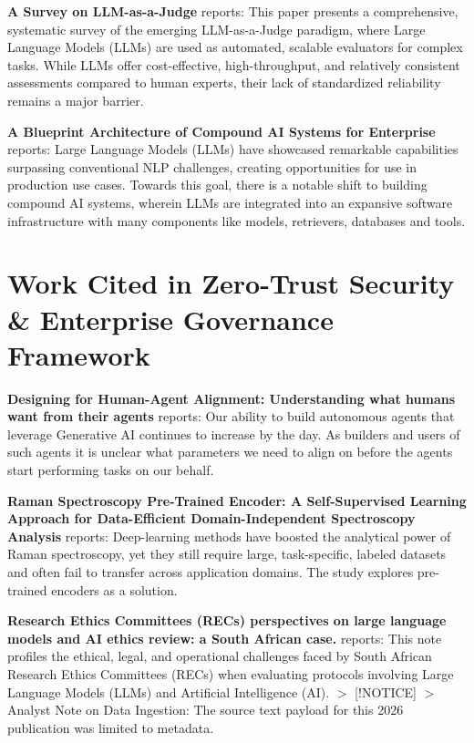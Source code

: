 \documentclass{article}
\begin{document}
\textbf{A Survey on LLM-as-a-Judge} \cite{arxiv_2411_15594} reports: This paper presents a comprehensive, systematic survey of the emerging LLM-as-a-Judge paradigm, where Large Language Models (LLMs) are used as automated, scalable evaluators for complex tasks. While LLMs offer cost-effective, high-throughput, and relatively consistent assessments compared to human experts, their lack of standardized reliability remains a major barrier.

\textbf{A Blueprint Architecture of Compound AI Systems for Enterprise} \cite{arxiv_2406_00584} reports: Large Language Models (LLMs) have showcased remarkable capabilities surpassing conventional NLP challenges, creating opportunities for use in production use cases. Towards this goal, there is a notable shift to building compound AI systems, wherein LLMs are integrated into an expansive software infrastructure with many components like models, retrievers, databases and tools.


\section{Work Cited in Zero-Trust Security \& Enterprise Governance Framework}


\textbf{Designing for Human-Agent Alignment: Understanding what humans want from their agents} \cite{arxiv_2404_04289} reports: Our ability to build autonomous agents that leverage Generative AI continues to increase by the day. As builders and users of such agents it is unclear what parameters we need to align on before the agents start performing tasks on our behalf.

\textbf{Raman Spectroscopy Pre-Trained Encoder: A Self-Supervised Learning Approach for Data-Efficient Domain-Independent Spectroscopy Analysis} \cite{doaj_001772c2113c476d9d5d40452c8e10e1} reports: Deep-learning methods have boosted the analytical power of Raman spectroscopy, yet they still require large, task-specific, labeled datasets and often fail to transfer across application domains. The study explores pre-trained encoders as a solution.

\textbf{Research Ethics Committees (RECs) perspectives on large language models and AI ethics review: a South African case.} \cite{pubmed_42380865} reports: This note profiles the ethical, legal, and operational challenges faced by South African Research Ethics Committees (RECs) when evaluating protocols involving Large Language Models (LLMs) and Artificial Intelligence (AI). $>$ [!NOTICE] $>$ Analyst Note on Data Ingestion: The source text payload for this 2026 publication was limited to metadata.
\end{document}
